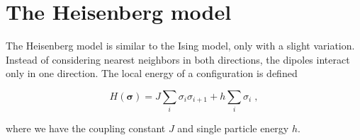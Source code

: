 \section{The Heisenberg model}

The Heisenberg model is similar to the Ising model, only with a slight variation. Instead of considering nearest neighbors in both directions, the dipoles interact only in one direction. The local energy of a configuration is defined

\begin{equation}
  H(\boldsymbol{\sigma}) =J\sum_{i}\sigma_i\sigma_{i+1}+h\displaystyle\sum_{i}\sigma_i \; ,
  \label{eq:Heisenberg_hamiltonian}
\end{equation}

where we have the coupling constant $J$ and single particle energy $h$.
